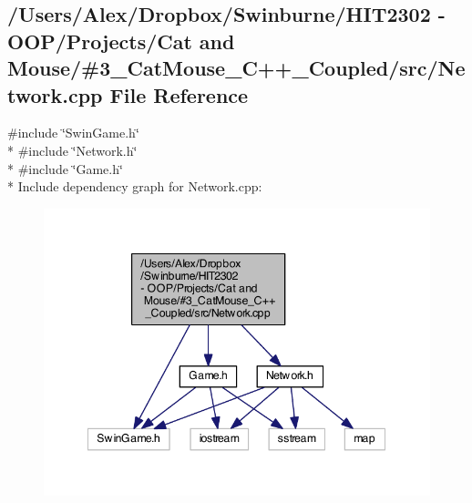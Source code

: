 \subsection{/\-Users/\-Alex/\-Dropbox/\-Swinburne/\-H\-I\-T2302 -\/ O\-O\-P/\-Projects/\-Cat and Mouse/\#3\-\_\-\-Cat\-Mouse\-\_\-\-C++\-\_\-\-Coupled/src/\-Network.cpp File Reference}
\label{_network_8cpp}
{\ttfamily \#include \char`\"{}Swin\-Game.\-h\char`\"{}}\\*
{\ttfamily \#include \char`\"{}Network.\-h\char`\"{}}\\*
{\ttfamily \#include \char`\"{}Game.\-h\char`\"{}}\\*
Include dependency graph for Network.\-cpp\-:
\nopagebreak
\begin{figure}[H]
\begin{center}
\leavevmode
\includegraphics[width=345pt]{_network_8cpp__incl}
\end{center}
\end{figure}
